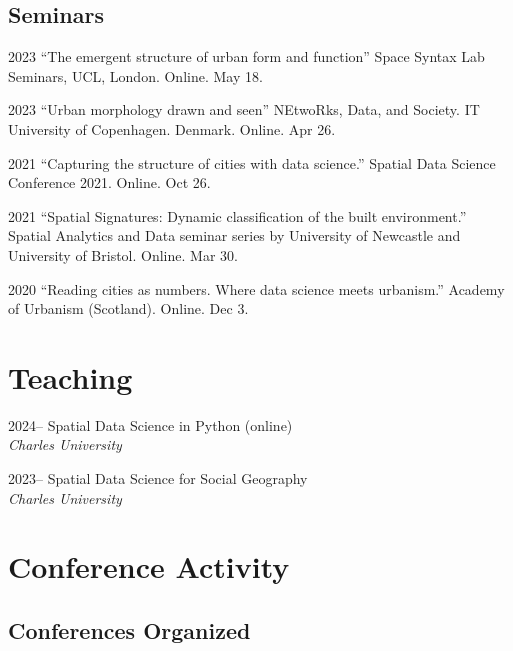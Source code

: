 \documentclass[12pt,a4paper]{report}
\begin{document}
    \subsection{Seminars}

    \begin{tablist}

        \item[2023] \tab{}\enquote{The emergent structure of urban form and function} Space Syntax Lab Seminars, UCL, London. Online. May 18.
        \item[2023] \tab{}\enquote{Urban morphology drawn and seen} NEtwoRks, Data, and Society. IT University of Copenhagen. Denmark. Online. Apr 26.
        \item[2021] \tab{}\enquote{Capturing the structure of cities with data science.} Spatial Data Science Conference 2021. Online. Oct 26.
        \item[2021] \tab{}\enquote{Spatial Signatures: Dynamic classification of the built environment.} Spatial Analytics and Data seminar series by University of Newcastle and University of Bristol. Online. Mar 30.
        \item[2020] \tab{}\enquote{Reading cities as numbers. Where data science meets urbanism.} Academy of Urbanism (Scotland). Online. Dec 3.

    \end{tablist}

    \section*{Teaching}

    \begin{tablist}

        \item[2024--] \tab{}Spatial Data Science in Python (online) \\
                            \textit{Charles University}
        \item[2023--] \tab{}Spatial Data Science for Social Geography \\
                            \textit{Charles University}

    \end{tablist}


    \section*{Conference Activity}


    \subsection*{Conferences Organized}
\end{document}
